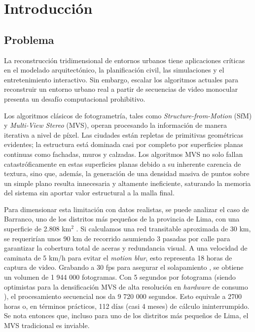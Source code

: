 \chapter{Introducción}

\section{Problema}

La reconstrucción tridimensional de entornos urbanos tiene aplicaciones críticas en el modelado arquitectónico, la planificación civil, las simulaciones y el entretenimiento interactivo. Sin embargo, escalar los algoritmos actuales para reconstruir un entorno urbano real a partir de secuencias de video monocular presenta un desafío computacional prohibitivo. 

Los algoritmos clásicos de fotogrametría, tales como \textit{Structure-from-Motion} (SfM) y \textit{Multi-View Stereo} (MVS), operan procesando la información de manera iterativa a nivel de píxel. Las ciudades están repletas de primitivas geométricas evidentes; la estructura está dominada casi por completo por superficies planas continuas como fachadas, muros y calzadas. Los algoritmos MVS no solo fallan catastróficamente en estas superficies planas debido a su inherente carencia de textura, sino que, además, la generación de una densidad masiva de puntos sobre un simple plano resulta innecesaria y altamente ineficiente, saturando la memoria del sistema sin aportar valor estructural a la malla final.

Para dimensionar esta limitación con datos realistas, se puede analizar el caso de Barranco, uno de los distritos más pequeños de la provincia de Lima, con una superficie de 2.808 km$^2$ \cite{wikipedia2023barranco}. Si calculamos una red transitable aproximada de 30 km, se requerirían unos 90 km de recorrido asumiendo 3 pasadas por calle para garantizar la cobertura total de aceras y redundancia visual. A una velocidad de caminata de 5 km/h para evitar el \textit{motion blur}, esto representa 18 horas de captura de video. Grabando a 30 fps para asegurar el solapamiento \cite{pix4d2024videophotogrammetry}, se obtiene un volumen de 1 944 000 fotogramas. Con 5 segundos por fotograma (siendo optimistas para la densificación MVS de alta resolución en \textit{hardware} de consumo \cite{schonberger2016structure}), el procesamiento secuencial nos da 9 720 000 segundos. Esto equivale a 2700 horas o, en términos prácticos, 112 días (casi 4 meses) de cálculo ininterrumpido. Se nota entonces que, incluso para uno de los distritos más pequeños de Lima, el MVS tradicional es inviable.

